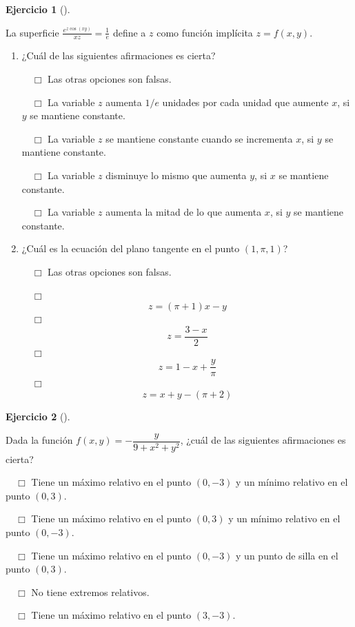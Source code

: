 \documentclass[
  a4paper,
]{scrreport}
\theoremstyle{definition}
\newtheorem{exercise}{Ejercicio}[chapter]
\theoremstyle{remark}
\begin{document}
\begin{exercise}[]\protect\hypertarget{exr-derivadas-funciones-varias-variables-propuesto-4}{}\label{exr-derivadas-funciones-varias-variables-propuesto-4}

La superficie \(\frac{e^{z\cos(xy)}}{xz}=\frac{1}{e}\) define a \(z\)
como función implícita \(z=f(x,y)\).

\begin{enumerate}
\def\labelenumi{\alph{enumi}.}
\item
  ¿Cuál de las siguientes afirmaciones es cierta?

  ${\quad\Box}$ Las otras opciones son falsas.

  ${\quad\Box}$ La variable $z$ aumenta $1/e$ unidades por cada unidad que aumente $x$, si $y$ se mantiene constante.

  ${\quad\Box}$ La variable $z$ se mantiene constante cuando se incrementa $x$, si $y$ se mantiene constante.

  ${\quad\Box}$ La variable $z$ disminuye lo mismo que aumenta $y$, si $x$ se mantiene constante.

  ${\quad\Box}$ La variable $z$ aumenta la mitad de lo que aumenta $x$, si $y$ se mantiene constante.
\item
  ¿Cuál es la ecuación del plano tangente en el punto \((1,\pi,1)\)?

  ${\quad\Box}$ Las otras opciones son falsas.

  ${\quad\Box}$ $$z=(\pi+1)x-y$$
  ${\quad\Box}$ $$z=\frac{3-x}{2}$$
  ${\quad\Box}$ $$z=1-x+\frac{y}{\pi}$$
  ${\quad\Box}$ $$z=x+y-(\pi+2)$$
\end{enumerate}

\end{exercise}

\begin{exercise}[]\protect\hypertarget{exr-derivadas-funciones-varias-variables-propuesto-5}{}\label{exr-derivadas-funciones-varias-variables-propuesto-5}

Dada la función \(f(x,y)=-\dfrac{y}{9+x^2+y^2}\), ¿cuál de las
siguientes afirmaciones es cierta?

${\quad\Box}$ Tiene un máximo relativo en el punto $(0,-3)$ y un mínimo relativo en el punto $(0,3)$.

${\quad\Box}$ Tiene un máximo relativo en el punto $(0,3)$ y un mínimo relativo en el punto $(0,-3)$.

${\quad\Box}$ Tiene un máximo relativo en el punto $(0,-3)$ y un punto de silla en el punto $(0,3)$.

${\quad\Box}$ No tiene extremos relativos.

${\quad\Box}$ Tiene un máximo relativo en el punto $(3,-3)$.

\end{exercise}
\end{document}
